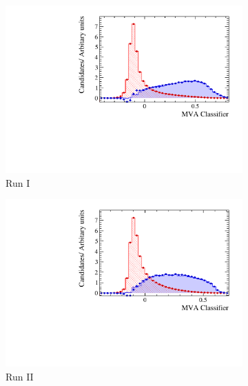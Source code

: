 \begin{figure}[!h]
\begin{subfigure}[t]{0.32\textwidth}
      \includegraphics[width=1.0\textwidth]{figs/Selection/Ds_BDT_classifier_Ds2PiPiPi_Run1.pdf}
      \caption{Run I \decay{\Dsp}{\pip\pim\pip}}
   \end{subfigure}
   \begin{subfigure}[t]{0.32\textwidth}
      \centering
      \includegraphics[width=1.0\textwidth]{figs/Selection/Ds_BDT_classifier_Ds2PiPiPi_Run2.pdf}
      \caption{Run II \decay{\Dsp}{\pip\pim\pip}}
   \end{subfigure}\\
   \begin{subfigure}[t]{0.32\textwidth}
      \centering

\end{subfigure}
\end{figure}
